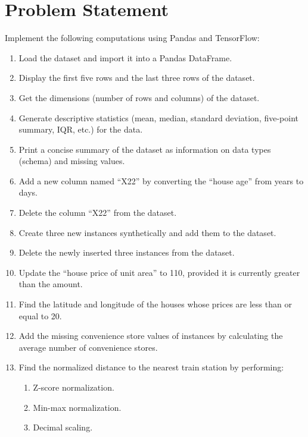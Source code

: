 \usepackage{graphicx}

\section*{Problem Statement}
\large
Implement the following computations using Pandas and TensorFlow:

\begin{enumerate}
    \item Load the dataset and import it into a Pandas DataFrame.
    \item Display the first five rows and the last three rows of the dataset.
      \item Get the dimensions (number of rows and columns) of the dataset.
    \item Generate descriptive statistics (mean, median, standard deviation, five-point summary, IQR, etc.) for the data.
    \item Print a concise summary of the dataset as information on data types (schema) and missing values.
    \item Add a new column named “X22” by converting the “house age” from years to days.
    \item Delete the column “X22” from the dataset.
    \item Create three new instances synthetically and add them to the dataset.
    \item Delete the newly inserted three instances from the dataset.
    \item Update the “house price of unit area” to 110, provided it is currently greater than the amount.
    \item Find the latitude and longitude of the houses whose prices are less than or equal to 20.
    \item Add the missing convenience store values of instances by calculating the average number of convenience stores.
    \item Find the normalized distance to the nearest train station by performing:
    \begin{enumerate}
        \item Z-score normalization.
        \item Min-max normalization.
        \item Decimal scaling.

\end{enumerate}
\end{enumerate}
